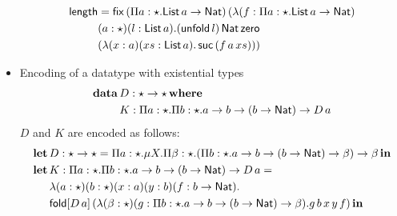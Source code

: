 \begin{itemize}
\begin{align*}
    \length &= \mathsf{fix}\,(\pai{a}{\star}{\List\,a \rightarrow \Nat})\,(\lambda(f : \pai{a}{\star}{\List\,a \rightarrow \Nat})\\&(a:\star)(l : \List\,a).
            (\unfold[\List\,a]{l})\,\Nat\,\zero\,\\&(\lambda(x : a)(xs : \List\,a).\,\suc\,(f\,a\,xs)))
  \end{align*}
\item Encoding of a datatype with existential types
  \begin{align*}
    \data\,&D : \star \rightarrow \star\,\where \\
           &K : \pai{a}{\star}{\pai{b}{\star}{a \rightarrow b \rightarrow (b \rightarrow \Nat)} \rightarrow D\,a}
  \end{align*}
  $D$ and $K$ are encoded as follows:
  \begin{align*}
    \letbb\,&D:\star \rightarrow \star = \pai{a}{\star}\miu{X}{\pai{\beta}{\star}{(\pai{b}{\star}{a \rightarrow b \rightarrow (b \rightarrow \Nat) \rightarrow \beta}) \rightarrow \beta}}\,\inb \\
    \letbb\,&K:\pai{a}{\star}{\pai{b}{\star}{a \rightarrow b \rightarrow (b \rightarrow \Nat)} \rightarrow D\,a} = \\
            &\lambda (a:\star)(b:\star)(x:a)(y:b)(f:b \rightarrow \Nat).\\
            &\fold{D\,a}{(\lambda (\beta : \star)(g: \pai{b}{\star}{a \rightarrow b \rightarrow (b \rightarrow \Nat) \rightarrow \beta}).g\,b\,x\,y\,f)}\,\inb
  \end{align*}
\end{itemize}




